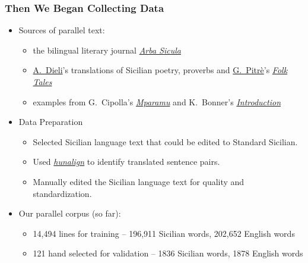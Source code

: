 \documentclass{beamer}
\begin{document}
\begin{frame}
  \frametitle{Then We Began Collecting Data}
  \begin{itemize}
  \item Sources of parallel text:
    \begin{itemize}
    \item the bilingual literary journal \href{https://www.arbasicula.org/}{\textit{Arba Sicula}}
    \item \href{http://www.dieli.net/}{A.~Dieli}'s translations of Sicilian poetry, proverbs and \href{https://en.wikipedia.org/wiki/Giuseppe_Pitr\%C3\%A8}{G.~Pitrè}'s \href{https://scn.wikipedia.org/wiki/F\%C3\%A0uli,_nueddi_e_cunti_pupulari_siciliani}{\textit{Folk Tales}}
    \item examples from G.~Cipolla's \href{http://www.arbasicula.org/LegasOnlineStore.html\#!/26-Learn-Sicilian-Mparamu-lu-sicilianu-by-Gaetano-Cipolla/p/82865121/category=0}{\textit{Mparamu}} and K.~Bonner's \href{http://www.arbasicula.org/LegasOnlineStore.html\#!/28-An-Introduction-to-Sicilian-Grammar-by-J-K-Kirk-Bonner-Edited-by-Gaetano-Cipolla/p/82865123/category=0}{\textit{Introduction}}
   \end{itemize}
  \vspace{0.5em}
  \item Data Preparation
    \begin{itemize}
    \item Selected Sicilian language text that could be edited to Standard Sicilian.
    \item Used \href{https://github.com/danielvarga/hunalign}{\textit{hunalign}} to identify translated sentence pairs.
    \item Manually edited the Sicilian language text for quality and standardization.
    \end{itemize}
  \vspace{0.5em}
  \item Our parallel corpus (so far):
    \begin{itemize}
    \item 14,494 lines for training -- 196,911 Sicilian words, 202,652 English words
    \item 121 hand selected for validation -- 1836 Sicilian words, 1878 English words
    \end{itemize}
  \end{itemize} 
\end{frame}
\end{document}
